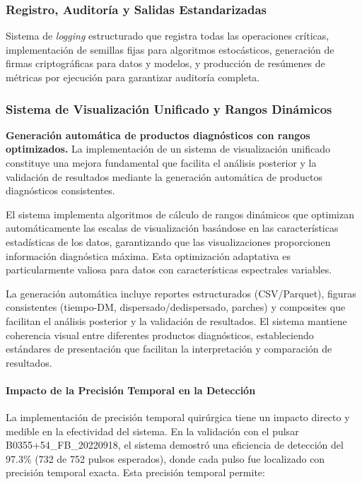 \subsubsection{Registro, Auditoría y Salidas Estandarizadas}

Sistema de \emph{logging} estructurado que registra todas las operaciones críticas, implementación de semillas fijas para algoritmos estocásticos, generación de firmas criptográficas para datos y modelos, y producción de resúmenes de métricas por ejecución para garantizar auditoría completa.

\subsubsection{Sistema de Visualización Unificado y Rangos Dinámicos}

\noindent\textbf{Generación automática de productos diagnósticos con rangos optimizados.} La implementación de un sistema de visualización unificado constituye una mejora fundamental que facilita el análisis posterior y la validación de resultados mediante la generación automática de productos diagnósticos consistentes.

El sistema implementa algoritmos de cálculo de rangos dinámicos que optimizan automáticamente las escalas de visualización basándose en las características estadísticas de los datos, garantizando que las visualizaciones proporcionen información diagnóstica máxima. Esta optimización adaptativa es particularmente valiosa para datos con características espectrales variables.

La generación automática incluye reportes estructurados (CSV/Parquet), figuras consistentes (tiempo-DM, dispersado/dedispersado, parches) y composites que facilitan el análisis posterior y la validación de resultados. El sistema mantiene coherencia visual entre diferentes productos diagnósticos, estableciendo estándares de presentación que facilitan la interpretación y comparación de resultados.

\paragraph{Impacto de la Precisión Temporal en la Detección}

La implementación de precisión temporal quirúrgica tiene un impacto directo y medible en la efectividad del sistema. En la validación con el pulsar B0355+54\_FB\_20220918, el sistema demostró una eficiencia de detección del 97.3\% (732 de 752 pulsos esperados), donde cada pulso fue localizado con precisión temporal exacta. Esta precisión temporal permite:

